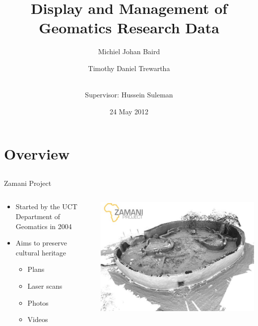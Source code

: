 \documentclass{beamer}
\title[Display and Management]{Display and Management of Geomatics Research Data}
\author{Michiel Johan Baird \and
    Timothy Daniel Trewartha \and
   \\  Supervisor: Hussein Suleman}
\date{24 May 2012}
\begin{document}
\begin{frame}
    \titlepage
\end{frame}

\section{Overview}
\subsection{}
\begin{frame}{Zamani Project}
\begin{columns}
\begin{column}{.65\linewidth}
\begin{itemize}
    \item Started by the UCT Department of Geomatics in 2004
    \item Aims to preserve cultural heritage
    \begin{itemize}
    \item Plans
    \item Laser scans
    \item Photos
    \item Videos
    \end{itemize}
\end{itemize}
\end{column}
\begin{column}{.35\linewidth}
\includegraphics[width=\linewidth]{images/zamani1.jpg} \\

\end{column}
\end{columns}
\end{frame}
\end{document}

